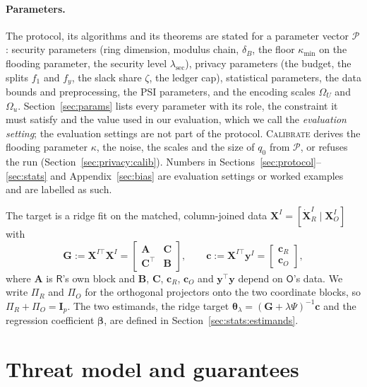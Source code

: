 \documentclass[11pt]{article}
\theoremstyle{definition}
\theoremstyle{plain}
\newcommand{\bX}{\mathbf{X}}
\newcommand{\bXOI}{\mathbf{X}_{O}^{I}}
\newcommand{\by}{\mathbf{y}}
\newcommand{\bbeta}{\boldsymbol{\beta}}
\newcommand{\btheta}{\boldsymbol{\theta}}
\newcommand{\bA}{\mathbf{A}}
\newcommand{\bB}{\mathbf{B}}
\newcommand{\bC}{\mathbf{C}}
\newcommand{\bcR}{\mathbf{c}_{R}}
\newcommand{\bcO}{\mathbf{c}_{O}}
\newcommand{\bc}{\mathbf{c}}
\newcommand{\bG}{\mathbf{G}}
\newcommand{\bI}{\mathbf{I}}
\newcommand{\dXR}{\dot{\mathbf{X}}_{R}}
\newcommand{\Party}[1]{\textsf{#1}}
\newcommand{\Rp}{\Party{R}}
\newcommand{\Op}{\Party{O}}
\newcommand{\PiR}{\Pi_{R}}
\newcommand{\PiO}{\Pi_{O}}
\begin{document}
\paragraph{Parameters.} The protocol, its algorithms and its theorems are stated for a parameter vector $\mathcal P$: security parameters (ring dimension, modulus chain, $\delta_B$, the floor $\kappa_{\min}$ on the flooding parameter, the security level $\lambda_{\mathrm{sec}}$), privacy parameters (the budget, the splits $f_1$ and $f_y$, the slack share $\zeta$, the ledger cap), statistical parameters, the data bounds and preprocessing, the PSI parameters, and the encoding scales $\Omega_U$ and $\Omega_u$. Section~\ref{sec:params} lists every parameter with its role, the constraint it must satisfy and the value used in our evaluation, which we call the \emph{evaluation setting}; the evaluation settings are not part of the protocol. \textsc{Calibrate} derives the flooding parameter $\kappa$, the noise, the scales and the size of $q_0$ from $\mathcal P$, or refuses the run (Section~\ref{sec:privacy:calib}). Numbers in Sections~\ref{sec:protocol}--\ref{sec:stats} and Appendix~\ref{sec:bias} are evaluation settings or worked examples and are labelled as such.

The target is a ridge fit on the matched, column-joined data $\bX^I = [\dXR^{I} \mid \bXOI]$ with
\begin{equation}
  \label{eq:gram}
  \bG := \bX^{I\top}\bX^I =
  \begin{bmatrix} \bA & \bC \\ \bC^{\top} & \bB \end{bmatrix}, \qquad
  \bc := \bX^{I\top}\by^{I} =
  \begin{bmatrix} \bcR \\ \bcO \end{bmatrix},
\end{equation}
where $\bA$ is $\Rp$'s own block and $\bB$, $\bC$, $\bcR$, $\bcO$ and $\by^\top\by$ depend on $\Op$'s data. We write $\PiR$ and $\PiO$ for the orthogonal projectors onto the two coordinate blocks, so $\PiR + \PiO = \bI_p$. The two estimands, the ridge target $\btheta_\lambda = (\bG + \lambda\Psi)^{-1}\bc$ and the regression coefficient $\bbeta$, are defined in Section~\ref{sec:stats:estimands}.

\section{Threat model and guarantees}
\label{sec:defs}
\end{document}
